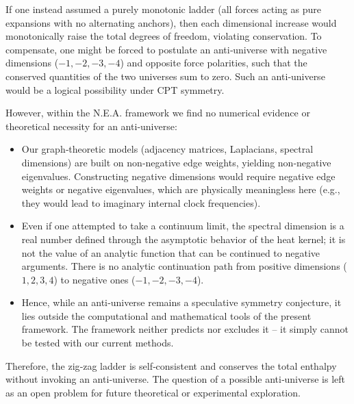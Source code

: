 \documentclass[12pt,a4paper]{article}
\begin{document}
If one instead assumed a purely monotonic ladder (all forces acting as pure expansions with no alternating anchors), then each dimensional increase would monotonically raise the total degrees of freedom, violating conservation. To compensate, one might be forced to postulate an anti‑universe with negative dimensions ($-1,-2,-3,-4$) and opposite force polarities, such that the conserved quantities of the two universes sum to zero. Such an anti‑universe would be a logical possibility under CPT symmetry.

However, within the N.E.A. framework we find no numerical evidence or theoretical necessity for an anti‑universe:
\begin{itemize}
    \item Our graph‑theoretic models (adjacency matrices, Laplacians, spectral dimensions) are built on non‑negative edge weights, yielding non‑negative eigenvalues. Constructing negative dimensions would require negative edge weights or negative eigenvalues, which are physically meaningless here (e.g., they would lead to imaginary internal clock frequencies).
    \item Even if one attempted to take a continuum limit, the spectral dimension is a real number defined through the asymptotic behavior of the heat kernel; it is not the value of an analytic function that can be continued to negative arguments. There is no analytic continuation path from positive dimensions ($1,2,3,4$) to negative ones ($-1,-2,-3,-4$).
    \item Hence, while an anti‑universe remains a speculative symmetry conjecture, it lies outside the computational and mathematical tools of the present framework. The framework neither predicts nor excludes it – it simply cannot be tested with our current methods.
\end{itemize}
Therefore, the zig‑zag ladder is self‑consistent and conserves the total enthalpy without invoking an anti‑universe. The question of a possible anti‑universe is left as an open problem for future theoretical or experimental exploration.
\end{document}
